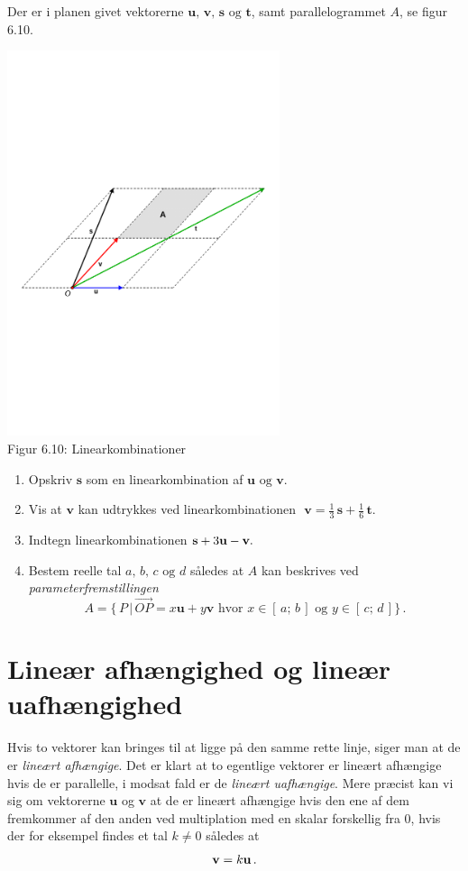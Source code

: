 \begin{exercise}
Der er i planen givet vektorerne $\mathbf u,\,\mathbf v,\,\mathbf s\,\,\mathrm{og}\,\, \mathbf t$, samt parallelogrammet $A$, se figur 6.10.
\begin{center}
		\includegraphics[trim=1cm 10.5cm 1cm 10cm,width=0.60\textwidth,clip]{geometer/vektor7.pdf}				
		\\Figur 6.10: Linearkombinationer
\end{center}
\begin{enumerate}
\item
Opskriv $\mathbf s$ som en linearkombination af $\mathbf u\,\, \mathrm{og}\,\,\mathbf v$.
\item
Vis at $\mathbf v$ kan udtrykkes ved linearkombinationen
$\,\,\mathbf v=\frac 13 \,\mathbf s+\frac 16 \,\mathbf t$.
\item
Indtegn linearkombinationen $\mathbf s+3\mathbf u -\mathbf{v} .$
\item
Bestem reelle tal $a,\,b,\,c\,\,\mathrm{og}\,\,d$ således at $A$ kan beskrives ved \textit{parameterfremstillingen}
$$ A=
 \{\,P\,\big|\,
\stackrel{\rightarrow}{OP}=x\mathbf u+y\mathbf v\,\,\mathrm{hvor}\,\,x\in \left[\,a;\,b\,\right]\,\,\mathrm{og}\,\,y\in \left[\,c;\,d\,\right]
 \}\,.$$
\end{enumerate}
\end{exercise}

\section{Lineær afhængighed og lineær uafhængighed} \label{tn6.seclinafh}
Hvis to vektorer kan bringes til at ligge på den samme rette linje, siger man at de er \textit{lineært afhængige}. Det er klart at to egentlige vektorer er lineært afhængige hvis de er parallelle, i modsat fald er de \textit{lineært uafhængige}. Mere præcist kan vi sig om vekto\-rerne $\mathbf u$ og $\mathbf v$ at de er lineært afhængige hvis den ene af dem fremkommer af den anden ved multiplation med en skalar forskellig fra $0$, hvis der for eksempel findes et tal $k\neq 0$ således at
$$\mathbf{v}=k\mathbf u\,.$$


